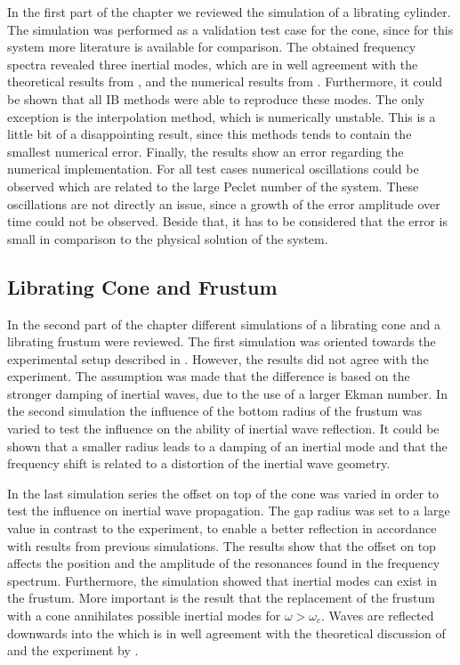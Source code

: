 In the first part of the chapter we reviewed the simulation of a librating cylinder.
The simulation was performed as a validation test case for the cone,
since for this system more literature is available for comparison.
The obtained frequency spectra revealed three inertial modes,
which are in well agreement with the theoretical results from \citep{Greenspan1990},  and the  numerical results from \citep{Sauret2012}.
Furthermore, it could be shown that all IB methods were able to reproduce these modes.
The only exception is the interpolation method, which is numerically unstable.
This is a little bit of a disappointing result, since this methods tends to contain
the smallest numerical error.
Finally, the results show an error regarding the numerical implementation.
For all test cases numerical oscillations could be observed which are related to the
large Peclet number of the system.
These oscillations are not directly an issue, since a growth of the error amplitude over time could not be observed.
Beside that, it has to be considered that the error is small in comparison to the physical solution of the system.

\subsection{Librating Cone and Frustum }

In the second part of the chapter different simulations of
a librating cone and a librating frustum were reviewed.
The first simulation was oriented towards the experimental setup described in \citep{Beardsley1970}.
However, the results  did not agree with the experiment.
The assumption was made that the difference is based on the  stronger damping of inertial waves,
due to the use of a larger Ekman number.
In the second simulation the influence of the bottom radius of the frustum was varied
to test the influence on the ability of inertial wave reflection.
It could be shown that a smaller radius leads to a damping of an inertial mode and that the frequency
shift is related to a distortion of the inertial wave geometry.

In the last simulation series  the offset on top of the cone was varied in order to test the influence on
inertial wave propagation. The gap radius was set to a large value in contrast to the experiment,
to enable a better reflection in accordance with results from previous simulations.
The results  show that the offset on top affects the position and the amplitude of the resonances
found in the frequency spectrum.
Furthermore, the simulation showed that inertial modes can exist in the frustum.
More important is the result that the replacement of the frustum with a cone annihilates possible
inertial modes for $\omega > \omega_c$.
Waves are reflected downwards into the  which is in well agreement with the
theoretical discussion of \citep{Greenspan1969} and the experiment by \citep{Beardsley1970}.

